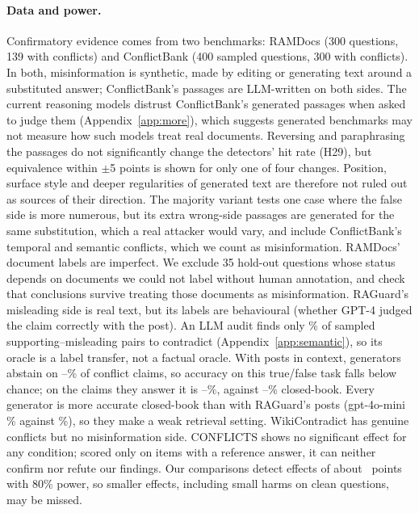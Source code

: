 \paragraph{Data and power.} Confirmatory evidence comes from two benchmarks: RAMDocs (300 questions, 139
with conflicts) and ConflictBank (400 sampled questions, 300 with conflicts). In both, misinformation is
synthetic, made by editing or generating text around a substituted answer; ConflictBank's passages are LLM-written
on both sides. The current reasoning models distrust ConflictBank's generated passages when asked to judge them
(Appendix~\ref{app:more}), which suggests generated benchmarks may not measure how such models treat real
documents. Reversing and paraphrasing the passages do not significantly change the detectors' hit rate (H29), but
equivalence within $\pm$5 points is shown for only one of four changes. Position, surface style and deeper regularities of generated text are therefore
not ruled out as sources of their direction. The majority variant tests one
case where the false side is more numerous, but its extra wrong-side passages are generated for the same substitution,
which a real attacker would vary, and include ConflictBank's temporal and semantic conflicts, which we count as
misinformation. RAMDocs' document labels are imperfect. We exclude 35 hold-out questions whose status depends on
documents we could not label without human annotation, and check that conclusions survive treating those
documents as misinformation. RAGuard's misleading side is real text, but its labels are behavioural (whether GPT-4
judged the claim correctly with the post). An LLM audit finds only \rgAudContradict\% of sampled supporting--misleading
pairs to contradict (Appendix~\ref{app:semantic}), so its oracle is a label transfer, not a factual oracle. With
posts in context, generators abstain on \rgAbstMin--\rgAbstMax\% of conflict claims, so accuracy on this
true/false task falls below chance; on the claims they answer it is \rgAnsMin--\rgAnsMax\%, against
\rgCbMin--\rgCbMax\% closed-book. Every generator is more accurate closed-book than with RAGuard's posts
(gpt-4o-mini \zcRgMiniConflict\% against \zpRgMiniConflict\%), so they make a weak retrieval setting.
WikiContradict has genuine conflicts but no misinformation side. CONFLICTS shows no significant effect for any
condition; scored only on items with a reference answer, it can neither confirm nor refute our findings. Our
comparisons detect effects of about \mdeMed\ points with 80\% power, so smaller effects, including small harms on clean
questions, may be missed.

